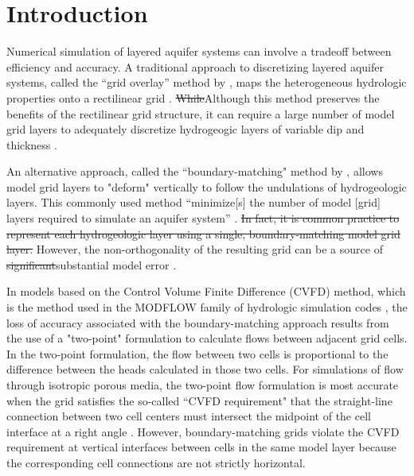 \documentclass{article}
\begin{document}

\section*{Introduction}

Numerical simulation of layered aquifer systems can involve a tradeoff between efficiency and accuracy. A traditional approach to discretizing layered aquifer systems, called the ``grid overlay'' method by \cite{hoaglund2003}, maps the heterogeneous hydrologic properties onto a rectilinear grid \citep{modflow84}. {\color{red} \sout{While}Although} this method preserves the benefits of the rectilinear grid structure, it can require a large number of model grid layers to adequately discretize hydrogeogic layers of variable dip and thickness \citep{Zyvoloski2006}.

An alternative approach, called the ``boundary-matching" method by \cite{hoaglund2003}, allows model grid layers to "deform" vertically to follow the undulations of hydrogeologic layers. This {\color{red} commonly used} method ``minimize[s] the number of model [grid] layers required to simulate an aquifer system'' \citep{modflow84}. {\color{red} \sout{In fact, it is common practice to represent each hydrogeologic layer using a single, boundary-matching model grid layer. }}However, the non-orthogonality of the resulting grid can be a source of {\color{red} \sout{significant}substantial} model error \citep{hoaglund2003}.

In models based on the Control Volume Finite Difference {\color{red} (CVFD)} method, which is the method used in the MODFLOW family of hydrologic simulation codes \citep{modflow6gwf, langevin2024}, the loss of accuracy associated with the boundary-matching approach results from the use of a "two-point" formulation to calculate flows between adjacent grid cells. In the two-point formulation, the flow between two cells is proportional to the difference between the heads calculated in those two cells. For simulations of flow through isotropic porous media, the two-point flow formulation is most accurate when the grid satisfies the so-called ``CVFD requirement" \citep{modflowusg, modflow6gwf} that the straight-line connection between two cell centers must intersect the midpoint of the cell interface at a right angle \citep{narasimhan1976integrated}. However, boundary-matching grids violate the CVFD requirement at vertical interfaces between cells in the same model layer because the corresponding cell connections are not strictly horizontal.
\end{document}

